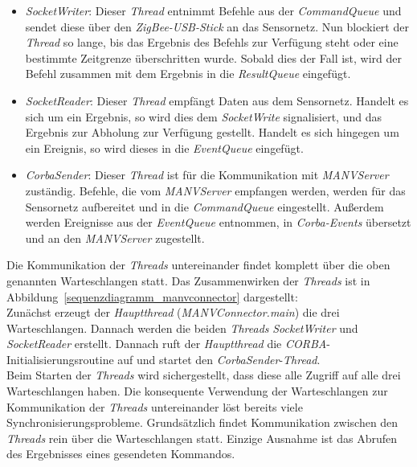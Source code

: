 \begin{itemize}
    \item{\emph{SocketWriter}:} Dieser \emph{Thread} entnimmt Befehle aus der \emph{CommandQueue} und sendet
                         diese über den \emph{ZigBee-USB-Stick} an das Sensornetz. Nun blockiert der
                         \emph{Thread} so lange, bis das Ergebnis des Befehls zur Verfügung steht oder
                         eine bestimmte Zeitgrenze überschritten wurde.
                         Sobald dies der Fall ist, wird der Befehl zusammen mit dem Ergebnis in
                         die \emph{ResultQueue} eingefügt. 
    \item{\emph{SocketReader}:} Dieser \emph{Thread} empfängt Daten aus dem Sensornetz. Handelt es sich um ein
                         Ergebnis, so wird dies dem \emph{SocketWrite} signalisiert, und das
                         Ergebnis zur Abholung zur Verfügung gestellt. Handelt es sich hingegen um ein
                         Ereignis, so wird dieses
                         in die \emph{EventQueue} eingefügt.
    \item{\emph{CorbaSender}:} Dieser \emph{Thread} ist für die Kommunikation mit \emph{MANVServer} zuständig.
                         Befehle, die vom \emph{MANVServer} empfangen werden, werden für das 
                         Sensornetz aufbereitet und in die \emph{CommandQueue} eingestellt.
                         Außerdem werden Ereignisse aus der \textsl{EventQueue} entnommen,
                         in \emph{Corba-Events} übersetzt und an den \emph{MANVServer} zugestellt.
\end{itemize}                          

Die Kommunikation der \emph{Threads} untereinander findet komplett über die oben genannten Warteschlangen statt. Das 
Zusammenwirken der \emph{Threads} ist in Abbildung~\ref{sequenzdiagramm_manvconnector} dargestellt:\\

Zunächst erzeugt der \emph{Hauptthread} (\emph{MANVConnector.main}) die drei Warteschlangen. Dannach werden die beiden 
\emph{Threads} \emph{SocketWriter} und \emph{SocketReader} erstellt. Dannach ruft der 
\emph{Hauptthread} die \emph{CORBA}-Initialisierungsroutine auf und startet den \emph{CorbaSender}-\emph{Thread}.\\

Beim Starten der \emph{Threads} wird sichergestellt, dass diese alle Zugriff auf alle drei Warteschlangen haben. Die konsequente 
Verwendung der Warteschlangen zur Kommunikation der \emph{Threads} untereinander löst bereits viele 
Synchronisierungsprobleme. Grundsätzlich findet Kommunikation zwischen den \emph{Threads} rein über die Warteschlangen 
statt. Einzige Ausnahme ist das Abrufen des Ergebnisses eines gesendeten Kommandos. 

